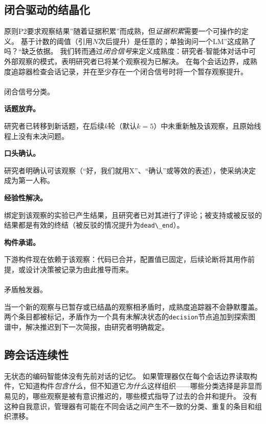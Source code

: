 \documentclass[
]{article}
\makeatletter
\let\oldparagraph\paragraph
\renewcommand{\paragraph}{
    \@ifstar
      \xxxParagraphStar
      \xxxParagraphNoStar
  }
\newcommand{\xxxParagraphStar}[1]{\oldparagraph*{#1}\mbox{}}
\newcommand{\xxxParagraphNoStar}[1]{\oldparagraph{#1}\mbox{}}
\newcommand{\passthrough}[1]{#1}
\theoremstyle{definition}
\makeatother
\begin{document}
\subsection{闭合驱动的结晶化}\label{sec-app-lrm-maturity}

原则P2要求观察结果''随着证据积累''而成熟，但\emph{证据积累}需要一个可操作的定义。
基于计数的阈值（引用\(N\)次后提升）是任意的；单独询问一个LM''这成熟了吗？``缺乏依据。
我们转而通过\emph{闭合信号}来定义成熟度：研究者-智能体对话中可外部观察的模式，表明研究者已将某个观察视为已解决。
在每个会话边界，成熟度追踪器检查会话记录，并在至少存在一个闭合信号时将一个暂存观察提升。

\paragraph{闭合信号分类。}\label{ux95edux5408ux4fe1ux53f7ux5206ux7c7b}

\textbf{话题放弃。}

研究者已转移到新话题，在后续\(k\)轮（默认\(k=5\)）中未重新触及该观察，且原始线程上没有未决问题。

\textbf{口头确认。}

研究者明确认可该观察（``好，我们就用X''、``确认''或等效的表述），使采纳决定成为第一人称。

\textbf{经验性解决。}

绑定到该观察的实验已产生结果，且研究者已对其进行了评论；被支持或被反驳的结果都是有效的终结（被反驳的情况提升为\passthrough{\lstinline!dead\_end!}）。

\textbf{构件承诺。}

下游构件现在依赖于该观察：代码已合并，配置值已固定，后续论断将其用作前提，或设计决策被记录为由此推导而来。

\paragraph{矛盾触发器。}\label{ux77dbux76feux89e6ux53d1ux5668}

当一个新的观察与已暂存或已结晶的观察相矛盾时，成熟度追踪器不会静默覆盖。
两个条目都被标记，矛盾作为一个具有未解决状态的\passthrough{\lstinline!decision!}节点追加到探索图谱中，解决推迟到下一次简报，由研究者明确裁定。

\subsection{跨会话连续性}\label{sec-app-lrm-continuity}

无状态的编码智能体没有先前对话的记忆。
如果管理器仅在每个会话边界读取构件，它知道构件\emph{包含什么}，但不知道它\emph{为什么}这样组织------哪些分类选择是非显而易见的，哪些观察是被有意识推迟的，哪些模式指导了过去的合并和提升。
没有这种自我意识，管理器有可能在不同会话之间产生不一致的分类、重复的条目和组织漂移。
\end{document}

